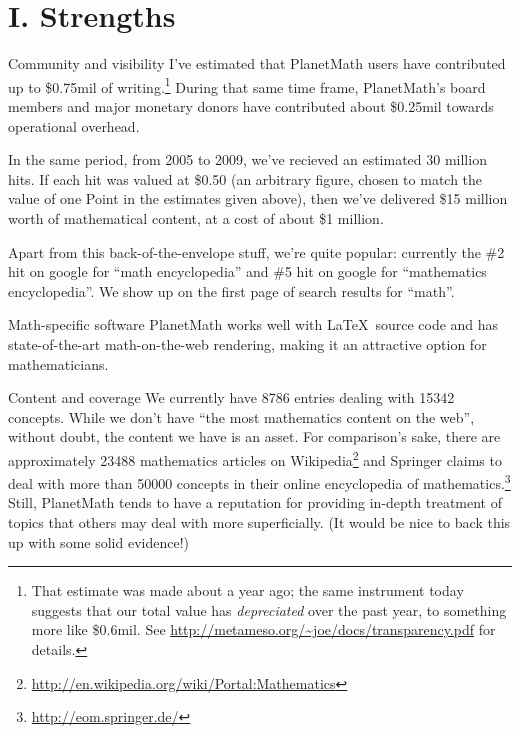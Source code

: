 \section*{I. Strengths}

\begin{paragraph}{Community and visibility}
I've estimated that PlanetMath users have contributed up
to \$0.75mil of writing.\footnote{\label{depreciation}That
  estimate was made about a year ago; the same instrument
  today suggests that our total value has
  \emph{depreciated} over the past year, to something more
  like \$0.6mil. See
  \url{http://metameso.org/~joe/docs/transparency.pdf} for
  details.}  During that same time frame, PlanetMath's
board members and major monetary donors have contributed
about \$0.25mil towards operational overhead.

In the same period, from 2005 to 2009, we've recieved an
estimated 30 million hits.  If each hit was valued at
\$0.50 (an arbitrary figure, chosen to match the value of
one Point in the estimates given above), then we've
delivered \$15 million worth of mathematical content, at a
cost of about \$1 million.

Apart from this back-of-the-envelope stuff, we're quite
popular: currently the \#2 hit on google for ``math
encyclopedia'' and \#5 hit on google for ``mathematics
encyclopedia''.  We show up on the first page of search
results for ``math''.
\end{paragraph}

\begin{paragraph}{Math-specific software}
PlanetMath works well with \LaTeX\ source code and has
state-of-the-art math-on-the-web rendering, making it an
attractive option for mathematicians.
\end{paragraph}

\begin{paragraph}{Content and coverage}
We currently have 8786 entries dealing with 15342
concepts.  While we don't have ``the most mathematics
content on the web'', without doubt, the content we have
is an asset.  For comparison's sake, there are
approximately 23488 mathematics articles on
Wikipedia\footnote{\url{http://en.wikipedia.org/wiki/Portal:Mathematics}}
and Springer claims to deal with more than 50000 concepts
in their online encyclopedia of
mathematics.\footnote{\url{http://eom.springer.de/}}
Still, PlanetMath tends to have a reputation for providing
in-depth treatment of topics that others may deal with
more superficially.  (It would be nice to back this up
with some solid evidence!)
\end{paragraph}

